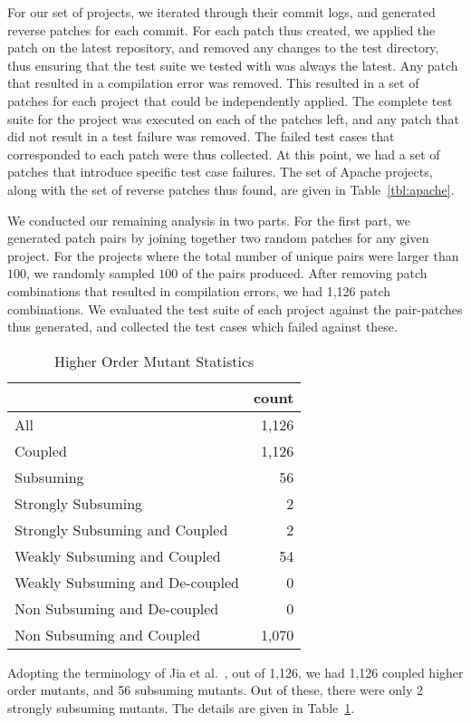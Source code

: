 \documentclass[preprint,nonatbib]{sigplanconf}\usepackage[]{graphicx}\usepackage[]{color}
\begin{document}
For our set of projects, we iterated through their commit
logs, and generated reverse patches for each commit. For each patch thus
created, we applied the patch on the latest repository, and removed any changes
to the test directory, thus ensuring that the test suite we tested with was
always the latest. Any patch that resulted in a compilation error was removed.
This resulted in a set of patches for each project that could be independently
applied. The complete test suite for the project was executed on each of the
patches left, and any patch that did not result in a test failure was
removed. The failed test cases that corresponded to each patch were thus
collected. At this point, we had a set of patches that introduce specific test
case failures.  The set of Apache projects, along with the set of reverse
patches thus found, are given in Table~\ref{tbl:apache}.

We conducted our remaining analysis in two parts. For the first part,
we generated patch pairs by joining together two random patches for
any given project. For the projects where the total number of unique pairs
were larger than $100$, we randomly sampled $100$ of the pairs produced.
After removing patch combinations that resulted in compilation errors, we had
1,126 patch combinations.
We evaluated the test suite of each project against the pair-patches thus
generated, and collected the test cases which failed against these.
\begin{table}
\centering
\begin{tabular}{|l|r|}
  \hline
 & count \\ 
  \hline
All & 1,126 \\ 
  Coupled & 1,126 \\ 
  Subsuming &  56 \\ 
  Strongly Subsuming &   2 \\ 
  Strongly Subsuming and Coupled &   2 \\ 
  Weakly Subsuming and Coupled &  54 \\ 
  Weakly Subsuming and De-coupled &   0 \\ 
  Non Subsuming and De-coupled &   0 \\ 
  Non Subsuming and Coupled & 1,070 \\ 
   \hline
\end{tabular}

\caption{Higher Order Mutant Statistics}
\label{tbl:hom}
\end{table}
Adopting the terminology of Jia et al.~\cite{jia2009higher}, out of
1,126, we had 1,126 coupled higher order
mutants, and 56 subsuming mutants. Out of these,
there were only 2 strongly subsuming mutants. The
details are given in Table~\ref{tbl:hom}.
\end{document}
